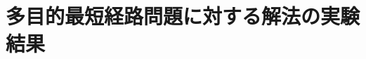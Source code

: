 \documentclass[12pt]{optlab-bachelor}
\begin{document}
\chapter{多目的最短経路問題に対する解法の実験結果}
\end{document}
